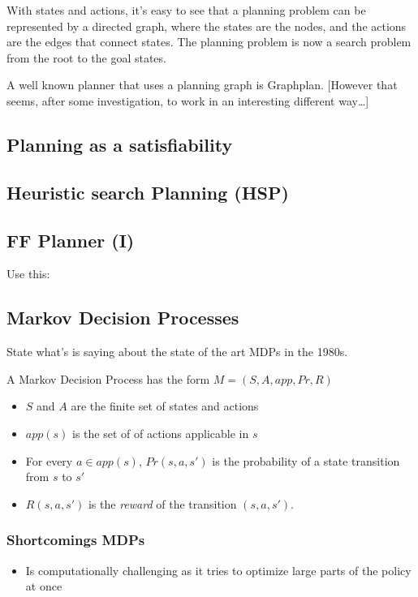 \documentclass[runningheads,a4paper]{llncs}
\begin{document}
With states and actions, it's easy to see that a planning problem can be
represented by a directed graph, where the states are the nodes, and the
actions are the edges that connect states. The planning problem is now
a search problem from the root to the goal states.

A well known planner that uses a planning graph is Graphplan.
[However that seems, after some investigation, to work in an interesting
different way\ldots]

\subsection{Planning as a satisfiability}

\subsection{Heuristic search Planning (HSP)}

\subsection{FF Planner (I)}
Use this: \cite{Hoffmann01theff}

\subsection{Markov Decision Processes}

State what's \cite{monahan1982state} is saying about the state of the art MDPs
in the 1980s.

\noindent A Markov Decision Process has the form $M = (S, A, app, Pr, R)$

\begin{itemize}
	\item $S$ and $A$ are the finite set of states and actions
	\item $app(s)$ is the set of of actions applicable in $s$
	\item For every $a \in app(s)$, $Pr(s,a,s')$ is the probability of a state
		transition from $s$ to $s'$
	\item $R(s,a,s')$ is the \emph{reward} of the transition $(s,a,s')$.
\end{itemize}

\subsubsection{Shortcomings MDPs}
\begin{itemize}
	\item Is computationally challenging as it tries to optimize large parts of the policy at once
\end{itemize}
\end{document}
